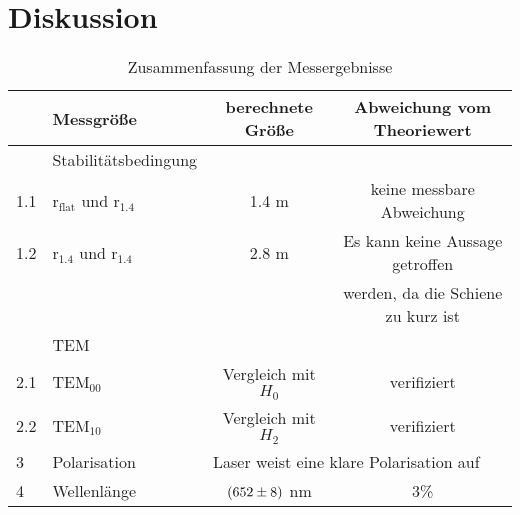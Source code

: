 \section{Diskussion}
\label{sec:Diskussion}

\begin{table}
  \centering
  \begin{tabular}{l|l | c c}
    \toprule
	&Messgröße	& berechnete Größe	& Abweichung vom Theoriewert \\
    \midrule
	& Stabilitätsbedingung \\
	1.1& \rightarrow $\text{r}_\text{flat}$ und $\text{r}_\text{1.4}$ & 1.4 m & keine messbare Abweichung \\
	1.2& \rightarrow $\text{r}_\text{1.4}$ und $\text{r}_\text{1.4}$ & 2.8 m& Es kann keine Aussage getroffen \\
	& & &werden, da die Schiene zu kurz ist \\
	& TEM\\
	2.1& \rightarrow TEM$_{00}$ & Vergleich mit $H_0$ & verifiziert \\
	2.2& \rightarrow TEM$_{10}$ & Vergleich mit $H_2$ & verifiziert \\
	3& Polarisation& \multicolumn{2}{l}{Laser weist eine klare Polarisation auf} \\
	4& Wellenlänge & $(\num{652 +-8})$ nm & 3\% \\
    \bottomrule
  \end{tabular}
  \caption{Zusammenfassung der Messergebnisse}
  \label{tab:Mess}
\end{table}

